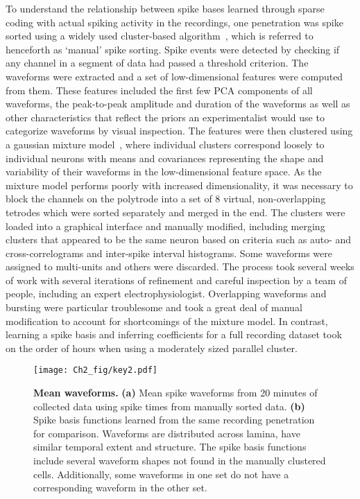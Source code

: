 To understand the relationship between spike bases learned through
sparse coding with actual spiking activity in the recordings, one
penetration was spike sorted using a widely used cluster-based
algorithm~\cite{Harris:2000fk}, which is referred to henceforth as
`manual' spike sorting. Spike events were detected by checking if any
channel in a segment of data had passed a threshold criterion. The
waveforms were extracted and a set of low-dimensional features were
computed from them. These features included the first few PCA
components of all waveforms, the peak-to-peak amplitude and duration
of the waveforms as well as other characteristics that reflect the
priors an experimentalist would use to categorize waveforms by visual
inspection. The features were then clustered using a gaussian mixture
model~\cite{bishop2006pattern}, where individual clusters correspond
loosely to individual neurons with means and covariances representing
the shape and variability of their waveforms in the low-dimensional
feature space. As the mixture model performs poorly with increased
dimensionality, it was necessary to block the channels on the
polytrode into a set of 8 virtual, non-overlapping tetrodes which were
sorted separately and merged in the end. The clusters were loaded into
a graphical interface and manually modified, including merging
clusters that appeared to be the same neuron based on criteria such as
auto- and cross-correlograms and inter-spike interval histograms. Some
waveforms were assigned to multi-units and others were discarded. The
process took several weeks of work with several iterations of
refinement and careful inspection by a team of people, including an
expert electrophysiologist. Overlapping waveforms and bursting were
particular troublesome and took a great deal of manual modification to
account for shortcomings of the mixture model. In contrast, learning a
spike basis and inferring coefficients for a full recording dataset
took on the order of hours when using a moderately sized parallel
cluster.

\begin{figure}[ht!]
  \centering
  \texttt{[image: Ch2\_fig/key2.pdf]}
  \caption{\textbf{Mean waveforms.} \textbf{(a)} Mean spike waveforms
    from 20 minutes of collected data using spike times from manually
    sorted data. \textbf{(b)} Spike basis functions learned from the
    same recording penetration for comparison. Waveforms are
    distributed across lamina, have similar temporal extent and
    structure. The spike basis functions include several waveform
    shapes not found in the manually clustered cells. Additionally,
    some waveforms in one set do not have a corresponding waveform in
    the other set.}
  \label{fig:meanwaveforms}
\end{figure}

